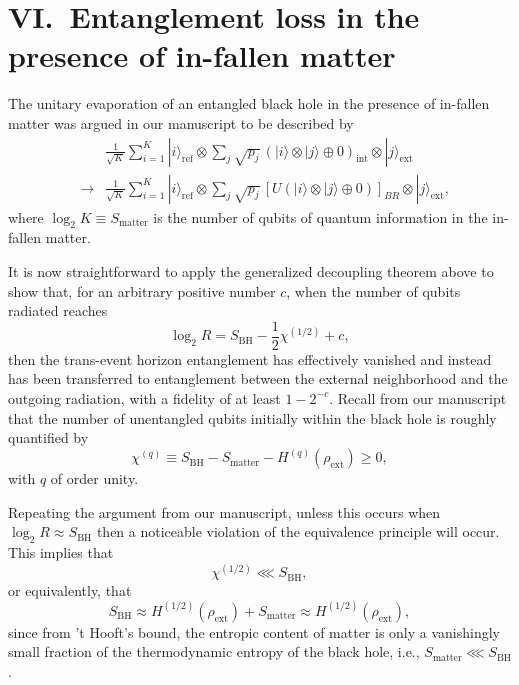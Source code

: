 \documentclass[twocolumn,aps,showpacs,prl]{revtex4}
\begin{document}
\section{VI.\ Entanglement loss in the presence of in-fallen matter}

The unitary evaporation of an entangled black hole in the
presence of in-fallen matter was argued in our manuscript to be 
described by
\begin{eqnarray}
&&\frac{1}{\sqrt{K}}\sum_{i=1}^K |i\rangle_{\text{ref}}\otimes
\sum_{j}\sqrt{p_j}\,(|i\rangle\otimes |j\rangle\oplus 0)_{\text{int}}
\otimes|j\rangle_{\text{ext}}\label{entUmodelapp} \\
&\rightarrow&
\frac{1}{\sqrt{K}}\sum_{i=1}^K |i\rangle_{\text{ref}}\otimes
\!\sum_{j}\sqrt{p_j}\,[U(|i\rangle\otimes |j\rangle\oplus 0)]_{BR}
\otimes|j\rangle_{\text{ext}}, \nonumber
\end{eqnarray}
where $\log_2 K\equiv S_{\text{matter}}$ is the number of qubits of
quantum information in the in-fallen matter.

It is now straightforward to apply the generalized decoupling
theorem above to show that, for an arbitrary positive number $c$, when 
the number of qubits radiated reaches
\begin{equation}
\log_2 R = S_{\text{BH}}-\frac{1}{2}\chi^{(1/2)} +c,
\end{equation}
then the trans-event horizon entanglement has effectively vanished
and instead has been transferred to entanglement between the
external neighborhood and the outgoing radiation, with
a fidelity of at least $1-2^{-c}$. Recall from our manuscript that
the number of unentangled qubits initially within the black hole
is roughly quantified by
\begin{equation}
\chi^{(q)}\equiv S_{\text{BH}} - S_{\text{matter}}
 -H^{(q)}(\rho_{\text{ext}})\ge 0, \label{chiqapp}
\end{equation}
with $q$ of order unity.

Repeating the argument from our manuscript, unless this occurs
when $\log_2 R \approx S_{\text{BH}}$ then a noticeable violation of
the equivalence principle will occur. This implies that
\begin{equation}
\chi^{(1/2)}\lll S_{\text{BH}},
\end{equation}
or equivalently, that
\begin{equation}
S_{\text{BH}}\approx H^{(1/2)}(\rho_{\text{ext}})+S_{\text{matter}}
\approx H^{(1/2)}(\rho_{\text{ext}}),
\end{equation}
since from 't Hooft's bound, the entropic content of matter
is only a vanishingly small fraction of the thermodynamic entropy
of the black hole, i.e., $S_{\text{matter}}\lll S_{\text{BH}}$.
\end{document}
